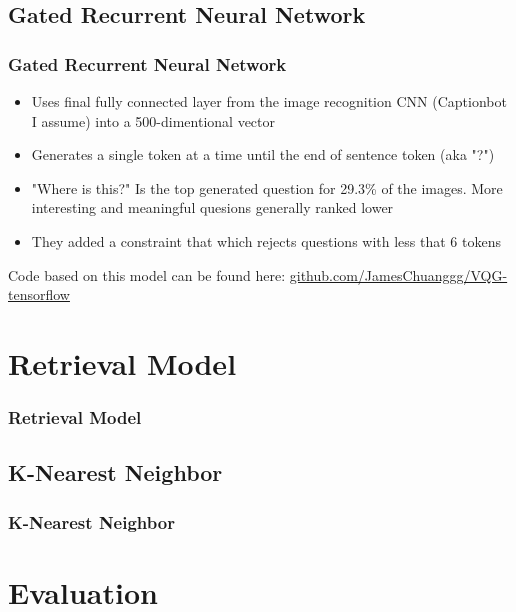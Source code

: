 \documentclass[xcolor=dvipsnames]{beamer}
\begin{document}
		\subsection{Gated Recurrent Neural Network}
			
			\begin{frame}
				\frametitle{Gated Recurrent Neural Network}
				\begin{itemize}
					\item<1-> Uses final fully connected layer from the image recognition CNN (Captionbot I assume) into a 500-dimentional vector
					\item<2-> Generates a single token at a time until the end of sentence token (aka "?")
					\item<3-> "Where is this?" Is the top generated question for 29.3\% of the images. More interesting and meaningful quesions generally ranked lower
					\item<5-> They added a constraint that which rejects questions with less that 6 tokens
				\end{itemize}
				Code based on this model can be found here: \href{https://github.com/JamesChuanggg/VQG-tensorflow}{github.com/JamesChuanggg/VQG-tensorflow}
			\end{frame}
	
	\section{Retrieval Model}
		
		\begin{frame}
			\frametitle{Retrieval Model}
			
		\end{frame}
		
		\subsection{K-Nearest Neighbor}
			
			\begin{frame}
				\frametitle{K-Nearest Neighbor}
				
			\end{frame}
	
	\section{Evaluation}
		
\end{document}
